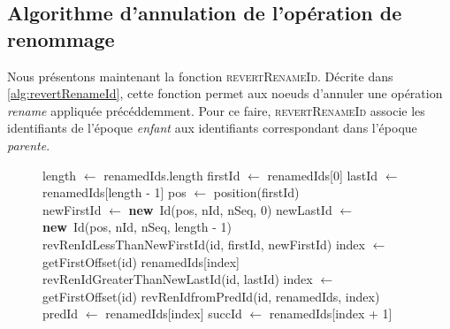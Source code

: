 \documentclass[12pt]{thesul}
\newcommand{\new}{\textbf{new}}
\begin{document}
\subsection{Algorithme d'annulation de l'opération de renommage}

\label{sec:reverting-rename-ops}

Nous présentons maintenant la fonction \textsc{revertRenameId}.
Décrite dans \autoref{alg:revertRenameId}, cette fonction permet aux noeuds d'annuler une opération \emph{rename} appliquée précéddemment.
Pour ce faire, \textsc{revertRenameId} associe les identifiants de l'époque \emph{enfant} aux identifiants correspondant dans l'époque \emph{parente}.

\begin{figure}[!ht]
  \footnotesize
  \begin{algorithmic}
          \State length $\gets$ renamedIds.length
          \State firstId $\gets$ renamedIds[0]
          \State lastId $\gets$ renamedIds[length - 1]
          \State pos $\gets$ position(firstId)
          \\
          \State newFirstId $\gets$ \new~Id(pos, nId, nSeq, 0)
          \State newLastId $\gets$ \new~Id(pos, nId, nSeq, length - 1)
          \\
              \State \Return revRenIdLessThanNewFirstId(id, firstId, newFirstId)
              \State index $\gets$ getFirstOffset(id)
              \State \Return renamedIds[index]
              \State \Return revRenIdGreaterThanNewLastId(id, lastId)
          \Else
              \State index $\gets$ getFirstOffset(id)
              \State \Return revRenIdfromPredId(id, renamedIds, index)
          \EndIf
      \EndFunction
      \\
          \State predId $\gets$ renamedIds[index]
          \State succId $\gets$ renamedIds[index + 1]

\end{algorithmic}
\end{figure}
\end{document}
